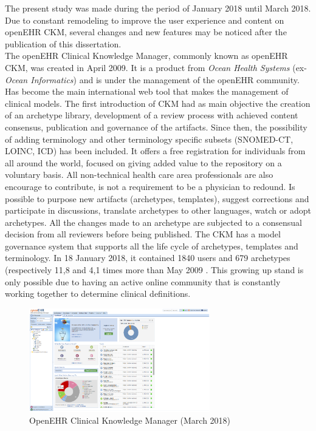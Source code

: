 \documentclass[mim_thesis.tex]{subfiles}
\begin{document}
The present study was made during the period of January 2018 until March 2018. Due to constant remodeling to improve the user experience and content on openEHR CKM, several changes and new features may be noticed after the publication of this dissertation.\\

The openEHR Clinical Knowledge Manager, commonly known as openEHR CKM, was created in April 2009. It is a product from \textit{Ocean Health Systems} (ex-\textit{Ocean Informatics}) and is under the management of the openEHR community. Has become the main international web tool that makes the management of clinical models. The first introduction of CKM had as main objective the creation of an archetype library, development of a review process with achieved content consensus, publication and governance of the artifacts. Since then, the possibility of adding terminology and other terminology specific subsets (SNOMED-CT, LOINC, ICD) has been included. It offers a free registration for individuals from all around the world, focused on giving added value to the repository on a voluntary basis. All non-technical health care area professionals are also encourage to contribute, is not a requirement to be a physician to redound. Is possible to purpose new artifacts (archetypes, templates), suggest corrections and participate in discussions, translate archetypes to other languages, watch or adopt archetypes. All the changes made to an archetype are subjected to a consensual decision from all reviewers before being published. The CKM has a model governance system that supports all the life cycle of archetypes, templates and terminology. In 18 January 2018, it contained 1840 users and 679 archetypes (respectively 11,8 and 4,1 times more than May 2009 \citep{conde2010towards}. This growing up stand is only possible due to having an active online community that is constantly working together to determine clinical definitions. 

\begin{figure}[H]
	\centering
    \includegraphics[width=0.7\textwidth]{img/openehr_ckm.PNG}
	\caption{OpenEHR Clinical Knowledge Manager (March 2018)}
	\label{fig:openehr_ckm}
\end{figure}
\end{document}
